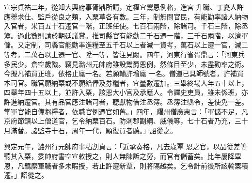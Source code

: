 \begin{pinyinscope}
 宣宗貞祐二年，從知大興府事胥鼎所請，定權宜鬻恩例格，進宮
 升職、丁憂人許應舉求仕、監戶從良之類，入粟草各有數。三年，制無問官民，有能勸率諸人納物入官者，米百五十石遷官一階，正班任使。七百石兩階，除諸司。千石三階，除丞簿。過此數則請於朝廷議賞。推司縣官有能勸二千石遷一階，三千石兩階，以濟軍儲。又定制，司縣官能勸率進糧至五千石以上者減一資考，萬石以上遷一官，減二等考，二萬石以上遷一官、陞一等，皆注見闕。四年，河東行省胥鼎言：「河東兵多民少，倉空歲饑。竊見潞州元帥府雖設鬻爵恩例，然條目至少，未盡勸率之術。今擬凡補買正班，依格止廕一名。若願輸許增廕
 一名。僧道已具師號者，許補買本司官。職官願納粟或不願給俸及券糧者，宜量數遷加。三舉終場人年五十以上，四舉年四十五以上，並許入粟，該恩大小官及承應人。令譯史吏員，雖未係班，亦許進納遷官。其有品官應注諸司者，聽獻物借注丞簿。丞簿注縣令，差使免一差。掌軍官能自備芻糧者，依職官例遷官如舊。」四年，耀州僧廣惠言：「軍儲不足，凡京府節鎮以上僧道官，乞令納粟百石。防刺郡副綱、威儀等，七十石者乃充，三十月滿替。諸監寺十石，周年一代，願復買者聽。」詔從之。



 興定元年，潞州行元帥府事粘割貞言：「近承奏格，凡去歲覃
 恩之官，以品從差等聽其入粟，委帥府書空宣敕授之，則人無陳訴之勞，而官有儲蓄矣。比年屢降覃恩，凡羈縻軍職者多未暇授，若止許遷新覃，則將隔越矣。乞令計前後所該輸粟積遷。」詔從之。



\end{pinyinscope}